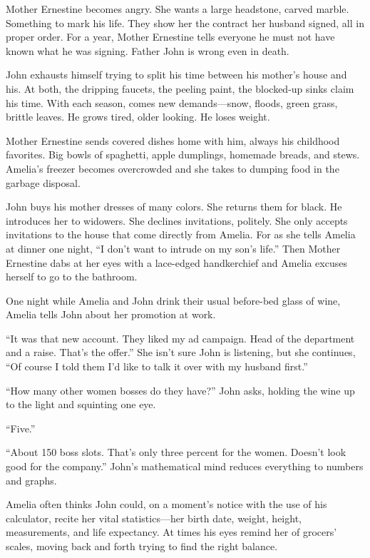 \documentclass[twoside,10pt]{book}
\begin{document}
Mother Ernestine becomes angry. She wants a large headstone, carved
marble. Something to mark his life. They show her the contract her
husband signed, all in proper order. For a year, Mother Ernestine tells
everyone he must not have known what he was signing. Father John is
wrong even in death.

John exhausts himself trying to split his time between his mother's
house and his. At both, the dripping faucets, the peeling paint, the
blocked-up sinks claim his time. With each season, comes new
demands---snow, floods, green grass, brittle leaves. He grows tired,
older looking. He loses weight.

Mother Ernestine sends covered dishes home with him, always his
childhood favorites. Big bowls of spaghetti, apple dumplings, homemade
breads, and stews. Amelia's freezer becomes over­crowded and she takes
to dumping food in the garbage disposal.

John buys his mother dresses of many colors. She returns them for black.
He introduces her to widowers. She declines invitations, politely. She
only accepts invitations to the house that come directly from Amelia.
For as she tells Amelia at dinner one night, ``I don't want to intrude
on my son's life.'' Then Mother Ernestine dabs at her eyes with a
lace-edged handkerchief and Amelia excuses her­self to go to the
bathroom.

One night while Amelia and John drink their usual before-bed glass of
wine, Amelia tells John about her promotion at work.

``It was that new account. They liked my ad campaign. Head of the
department and a raise. That's the offer.'' She isn't sure John is
listening, but she continues, ``Of course I told them I'd like to talk
it over with my husband first.''

``How many other women bosses do they have?'' John asks, holding the
wine up to the light and squinting one eye.

``Five.''

``About 150 boss slots. That's only three percent for the women. Doesn't
look good for the company.'' John's mathematical mind reduces everything
to numbers and graphs.

Amelia often thinks John could, on a moment's notice with the use of his
calculator, recite her vital statistics---her birth date, weight,
height, measurements, and life expectancy. At times his eyes remind her
of grocers' scales, moving back and forth trying to find the right
balance.
\end{document}
